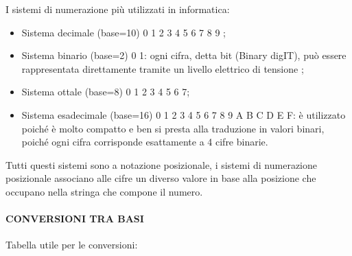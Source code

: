 \documentclass[
]{article}
\providecommand{\tightlist}{%
  \setlength{\itemsep}{0pt}\setlength{\parskip}{0pt}}
\begin{document}
{I sistemi di numerazione più utilizzati in informatica:}

{}

\begin{itemize}
\tightlist
\item
  {Sistema decimale (base=10) 0 1 2 3 4 5 6 7 8 9 ;}
\end{itemize}

{}

\begin{itemize}
\tightlist
\item
  {Sistema binario (base=2) 0 1: ogni cifra, detta bit (Binary digIT),
  può essere rappresentata direttamente tramite un livello elettrico di
  tensione ;}
\end{itemize}

{}

\begin{itemize}
\tightlist
\item
  {Sistema ottale (base=8) 0 1 2 3 4 5 6 7;}
\end{itemize}

{}

\begin{itemize}
\tightlist
\item
  {Sistema esadecimale (base=16) 0 1 2 3 4 5 6 7 8 9 A B C D E F: è
  utilizzato poiché è molto compatto e ben si presta alla traduzione in
  valori binari, poiché ogni cifra corrisponde esattamente a 4 cifre
  binarie. }
\end{itemize}

{}

{Tutti questi sistemi sono a notazione posizionale, i sistemi di
numerazione posizionale associano alle cifre un diverso valore in base
alla posizione che occupano nella stringa che compone il numero. }

{}

{}

\paragraph{\texorpdfstring{{CONVERSIONI TRA
BASI}}{CONVERSIONI TRA BASI}}\label{h.ixpima60nzrk}

{}

{Tabella utile per le conversioni:}

{}
\end{document}
